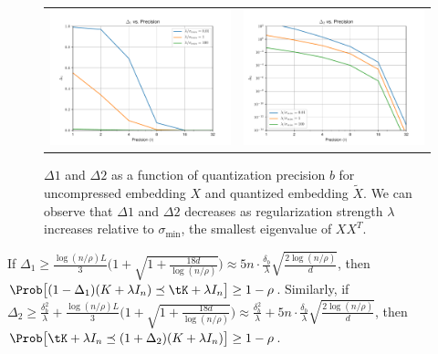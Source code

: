 \begin{figure}
	\centering	
	\begin{tabular}{c c}
		\includegraphics[width=0.45\linewidth]{figures/Delta1_vs_precision.pdf} &
		\includegraphics[width=0.45\linewidth]{figures/Delta2_vs_precision.pdf}
	\end{tabular}
	\label{fig:delta_vs_b}
	\caption{$\Delta1$ and $\Delta2$ as a function of quantization precision $b$ for uncompressed embedding $X$ and quantized embedding $\tilde{X}$. We can observe that $\Delta1$ and $\Delta2$ decreases as regularization strength $\lambda$ increases relative to $\sigma_{\min}$, the smallest eigenvalue of $XX^T$.}
\end{figure}



\begin{corollary}
	\label{cor:main2}
	If $\Delta_1 \geq \frac{\log(n/\rho)L}{3}\Big(1+\sqrt{1+\frac{18d}{\log(n/\rho)}}\Big) \approx 5n\cdot \frac{\delta_b}{\lambda}\sqrt{\frac{2\log(n/\rho)}{d}}$,
	then $\Prob\big[(1 - \Delta_1) (K + \lambda I_n) \preceq \tK + \lambda I_n \big] \geq  1 - \rho$. 
	Similarly, if $\Delta_2 \geq \frac{\delta_b^2}{\lambda} +  \frac{\log(n/\rho)L}{3}\Big(1+\sqrt{1+\frac{18d}{\log(n/\rho)}}\Big) \approx \frac{\delta_b^2}{\lambda} + 5n\cdot \frac{\delta_b}{\lambda}\sqrt{\frac{2\log(n/\rho)}{d}}$,
	then $\Prob\big[\tK + \lambda I_n \preceq (1 + \Delta_2) (K + \lambda I_n)\big] \geq  1 - \rho$. 
\end{corollary}


